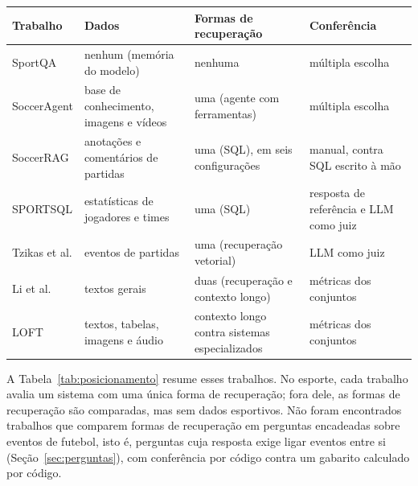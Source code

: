 \vspace{2mm}
\noindent\begin{minipage}{\columnwidth}
\centering\footnotesize\renewcommand{\arraystretch}{1.15}\setlength{\tabcolsep}{3pt}
\begin{tabular}{>{\raggedright\arraybackslash}p{}>{\raggedright\arraybackslash}p{}>{\raggedright\arraybackslash}p{}>{\raggedright\arraybackslash}p{}} %
\toprule
Trabalho & Dados & Formas de recuperação & Conferência \\
\midrule
SportQA \cite{xia2024sportqa} & nenhum (memória do modelo) & nenhuma & múltipla escolha \\
SoccerAgent \cite{rao2025socceragent} & base de conhecimento, imagens e vídeos & uma (agente com ferramentas) & múltipla escolha \\
SoccerRAG \cite{strand2024soccerrag} & anotações e comentários de partidas & uma (SQL), em seis configurações & manual, contra SQL escrito à mão \\
SPORTSQL \cite{martinez2025sportsql} & estatísticas de jogadores e times & uma (SQL) & resposta de referência e LLM como juiz \\
Tzikas et al. \cite{tzikas2025dynamic} & eventos de partidas & uma (recuperação vetorial) & LLM como juiz \\
Li et al. \cite{li2024ragorlongcontext} & textos gerais & duas (recuperação e contexto longo) & métricas dos conjuntos \\
LOFT \cite{lee2024loft} & textos, tabelas, imagens e áudio & contexto longo contra sistemas especializados & métricas dos conjuntos \\
\bottomrule
\end{tabular}
\label{tab:posicionamento}
\end{minipage}\par\smallskip

A Tabela~\ref{tab:posicionamento} resume esses trabalhos. No esporte, cada trabalho avalia um sistema com uma
única forma de recuperação; fora dele, as formas de recuperação são comparadas, mas sem dados esportivos. Não foram
encontrados trabalhos que comparem formas de recuperação em perguntas encadeadas sobre eventos de futebol, isto é,
perguntas cuja resposta exige ligar eventos entre si (Seção~\ref{sec:perguntas}), com conferência por código
contra um gabarito calculado por código.
